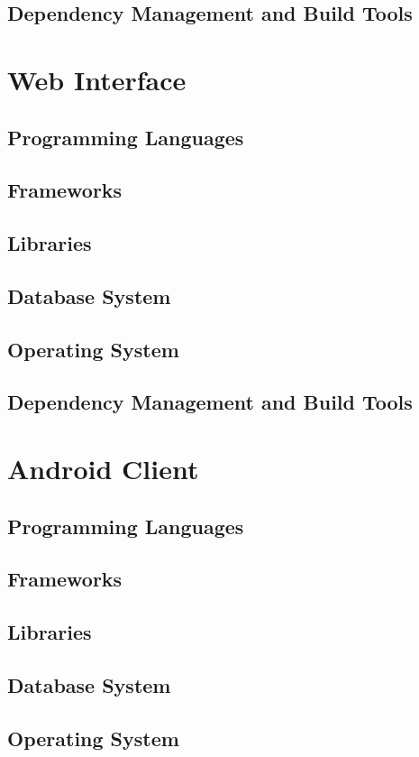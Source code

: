 \documentclass[11pt,fleqn]{book} %
\begin{document}
		\subsection{Dependency Management and Build Tools}
	\section{Web Interface}
		\subsection{Programming Languages}
		\subsection{Frameworks}
		\subsection{Libraries}
		\subsection{Database System}
		\subsection{Operating System}
		\subsection{Dependency Management and Build Tools}
	\section{Android Client}
		\subsection{Programming Languages}
		\subsection{Frameworks}
		\subsection{Libraries}
		\subsection{Database System}
		\subsection{Operating System}
\end{document}
